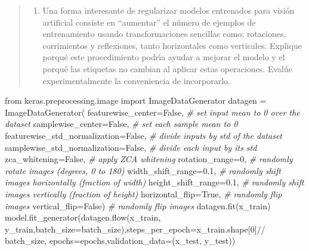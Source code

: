 \documentclass[11pt]{article}
\providecommand{\tightlist}{%
      \setlength{\itemsep}{0pt}\setlength{\parskip}{0pt}}
\newenvironment{Shaded}{}{}
\newcommand{\DecValTok}[1]{\textcolor[rgb]{0.25,0.63,0.44}{{#1}}}
\newcommand{\FloatTok}[1]{\textcolor[rgb]{0.25,0.63,0.44}{{#1}}}
\newcommand{\CommentTok}[1]{\textcolor[rgb]{0.38,0.63,0.69}{\textit{{#1}}}}
\newcommand{\NormalTok}[1]{{#1}}
\newcommand{\ImportTok}[1]{{#1}}
\newcommand{\VariableTok}[1]{\textcolor[rgb]{0.10,0.09,0.49}{{#1}}}
\newcommand{\OperatorTok}[1]{\textcolor[rgb]{0.40,0.40,0.40}{{#1}}}
\begin{document}
\begin{quote}
\begin{enumerate}
\def\labelenumi{\roman{enumi})}
\tightlist
\item
  Una forma interesante de regularizar modelos entrenados para visión
  artificial consiste en ``aumentar'' el número de ejemplos de
  entrenamiento usando transformaciones sencillas como: rotaciones,
  corrimientos y reflexiones, tanto horizontales como verticales.
  Explique porqué este procedimiento podrı́a ayudar a mejorar el modelo y
  el porqué las etiquetas no cambian al aplicar estas operaciones.
  Evalúe experimentalmente la conveniencia de incorporarlo.
\end{enumerate}
\end{quote}

\begin{Shaded}
\begin{Highlighting}[]
\ImportTok{from}\NormalTok{ keras.preprocessing.image }\ImportTok{import}\NormalTok{ ImageDataGenerator}
\NormalTok{datagen }\OperatorTok{=}\NormalTok{ ImageDataGenerator(}
\NormalTok{    featurewise_center}\OperatorTok{=}\VariableTok{False}\NormalTok{, }\CommentTok{# set input mean to 0 over the dataset}
\NormalTok{    samplewise_center}\OperatorTok{=}\VariableTok{False}\NormalTok{, }\CommentTok{# set each sample mean to 0}
\NormalTok{    featurewise_std_normalization}\OperatorTok{=}\VariableTok{False}\NormalTok{, }\CommentTok{# divide inputs by std of the dataset}
\NormalTok{    samplewise_std_normalization}\OperatorTok{=}\VariableTok{False}\NormalTok{, }\CommentTok{# divide each input by its std}
\NormalTok{    zca_whitening}\OperatorTok{=}\VariableTok{False}\NormalTok{, }\CommentTok{# apply ZCA whitening}
\NormalTok{    rotation_range}\OperatorTok{=}\DecValTok{0}\NormalTok{, }\CommentTok{# randomly rotate images (degrees, 0 to 180)}
\NormalTok{    width_shift_range}\OperatorTok{=}\FloatTok{0.1}\NormalTok{, }\CommentTok{# randomly shift images horizontally (fraction of width)}
\NormalTok{    height_shift_range}\OperatorTok{=}\FloatTok{0.1}\NormalTok{, }\CommentTok{# randomly shift images vertically (fraction of height)}
\NormalTok{    horizontal_flip}\OperatorTok{=}\VariableTok{True}\NormalTok{, }\CommentTok{# randomly flip images}
\NormalTok{    vertical_flip}\OperatorTok{=}\VariableTok{False}\NormalTok{) }\CommentTok{# randomly flip images}
\NormalTok{datagen.fit(x_train)}
\NormalTok{model.fit_generator(datagen.flow(x_train, y_train,batch_size}\OperatorTok{=}\NormalTok{batch_size),steps_per_epoch}\OperatorTok{=}\NormalTok{x_train.shape[}\DecValTok{0}\NormalTok{]}\OperatorTok{//}\NormalTok{ batch_size, epochs}\OperatorTok{=}\NormalTok{epochs,validation_data}\OperatorTok{=}\NormalTok{(x_test, y_test))}
\end{Highlighting}
\end{Shaded}
\end{document}
